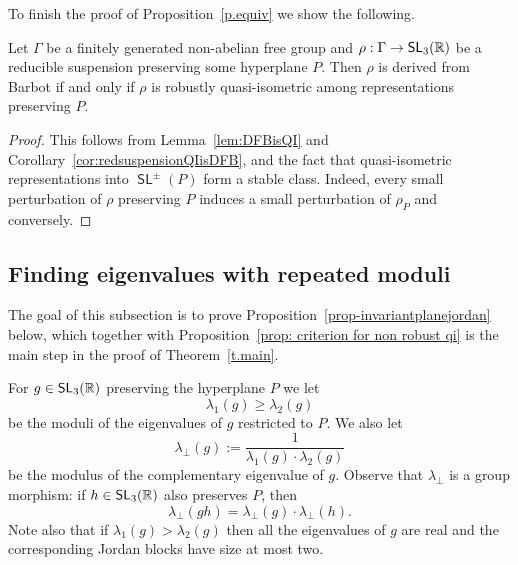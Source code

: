 \documentclass[AHL,Unicode,longabstracts]{cedram}
\DeclareMathOperator{\SL}{\mathsf{SL}}
\newcommand{\R}{\mathbb{R}}
\newcommand{\RR}{\R}
\renewcommand*{\to}{\mathchoice{\longrightarrow}{\rightarrow}{\rightarrow}{\rightarrow}}
\let\oldin\in
\renewcommand{\in}{\mathchoice{\oldin}{\oldin}{\,\oldin\,}{\,\oldin\,}}
\newcommand{\RR}{\mathbb{R}}
\begin{document}
To finish the proof of Proposition~\ref{p.equiv} we show the following.

\begin{coro}\label{cor:DFBandrobQI}
Let $\Gamma$ be a finitely generated non-abelian free group and $\rho:\Gamma \to \SL_3(\R)$ be a reducible suspension preserving some hyperplane $P$. Then $\rho$ is derived from Barbot if and only if $\rho$ is robustly quasi-isometric among representations preserving $P$.
\end{coro}



\begin{proof}
This follows from Lemma~\ref{lem:DFBisQI} and Corollary~\ref{cor:redsuspensionQIisDFB}, and the fact that quasi-isometric representations into $\SL^\pm(P)$ form a stable class.
Indeed, every small perturbation of $\rho$ preserving $P$ induces a small perturbation of $\rho_P$ and conversely.
\end{proof}



\subsection{Finding eigenvalues with repeated moduli}\label{ss.multiplicity}



The goal of this subsection is to prove Proposition~\ref{prop-invariantplanejordan} below, which together with Proposition~\ref{prop: criterion for non robust qi} is the main step in the proof of Theorem~\ref{t.main}.

For $g \in \SL_3(\RR)$ preserving the hyperplane $P$ we let
\[
\lambda_{1}(g)\geq \lambda_{2}(g)
\]
be the moduli of the eigenvalues of $g$ restricted to $P$.
We also let
\[
\lambda_{\perp}(g) := \frac{1}{\lambda_{1}(g)\cdot\lambda_{2}(g)}
\]
be the modulus of the complementary eigenvalue of $g$.
Observe that $\lambda_\perp$ is a group morphism: if $h\in\SL_3(\R)$ also preserves $P$, then
\[
\lambda_{\perp}(gh)=\lambda_{\perp}(g)\cdot \lambda_{\perp}(h).
\]
Note also that if $\lambda_1(g)>\lambda_2(g)$ then all the eigenvalues of $g$ are real and the corresponding Jordan blocks have size at most two.
\end{document}
